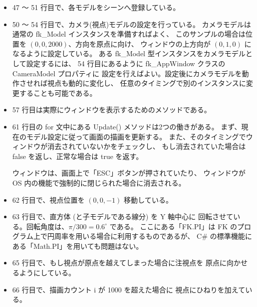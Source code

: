 \begin{itemize}
\item 47 〜 51 行目で、各モデルをシーンへ登録している。

\item 50 〜 54 行目で、カメラ(視点)モデルの設定を行っている。
	カメラモデルは通常の fk\_Model インスタンスを準備すればよく、
	このサンプルの場合は位置を	\((0,0, 2000)\)、方向を原点に向け、
	ウィンドウの上方向が \((0, 1, 0)\) になるように設定している。
	ある fk\_Model 型インスタンスをカメラモデルとして設定するには、
	54 行目にあるように fk\_AppWindow クラスの CameraModel プロパティに
	設定を行えばよい。設定後にカメラモデルを動作させれば視点も動的に変化し、
	任意のタイミングで別のインスタンスに変更することも可能である。
	
\item 57 行目は実際にウィンドウを表示するためのメソッドである。

\item 61 行目の for 文中にある Update() メソッドは2つの働きがある。
	まず、現在のモデル設定に従って画面の描画を更新する。
	また、そのタイミングでウィンドウが消去されていないかをチェックし、
	もし消去されていた場合は false を返し、正常な場合は true を返す。

	ウィンドウは、画面上で「ESC」ボタンが押されていたり、
	ウィンドウが OS 内の機能で強制的に閉じられた場合に消去される。

 \item 62 行目で、視点位置を \((0, 0, -1)\) 移動している。
 \item 63 行目で、直方体 (と子モデルである線分) を Y 軸中心に
	回転させている。回転角度は、\(\pi/300 = 0.6 ^{\circ}\) である。
	ここにある「FK.PI」は FK のプログラム上で円周率を用いる場合に利用するものであるが、
	C\# の標準機能にある「Math.PI」を用いても問題はない。
 \item 65 行目で、もし視点が原点を越えてしまった場合に注視点を
	原点に向かせるようにしている。
 \item 66 行目で、描画カウント i が 1000 を超えた場合に
	視点にひねりを加えている。
\end{itemize} ~
